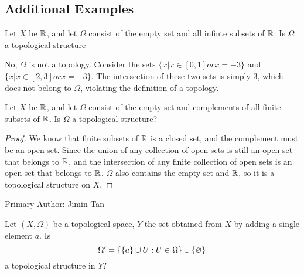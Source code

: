 \subsection{Additional Examples}

\begin{minorEx} %
  Let $X$ be $\mathbb{R}$, and let $\Omega$ consist of the empty set and
  all infinte subsets of $\mathbb{R}$. Is $\Omega$ a topological structure
\end{minorEx}

No, $\Omega$ is not a topology. Consider the sets $\{x | x \in [0, 1] or x = -3\}$ and $\{x | x \in [2, 3] or x = -3\}$. The intersection of these two sets is simply {3}, which does not belong to $\Omega$, violating the definition of a topology.


\begin{minorEx} %
  Let $X$ be $\mathbb{R}$, and let $\Omega$ consist of the empty set and
  complements of all finite subsets of $\mathbb{R}$. Is $\Omega$ a topological structure?
\end{minorEx}

\begin{proof}
We know that finite subsets of $\mathbb{R}$ is a closed set, and the complement must be an open set. Since the union of any collection of open sets is still an open set that belongs to $\mathbb{R}$, and the intersection of any finite collection of open sets is an open set that belongs to $\mathbb{R}$. $\Omega$ also contains the empty set and $\mathbb{R}$, so it is a topological structure on $X$.
\end{proof}

Primary Author: Jimin Tan

\begin{minorEx} %
    Let $(X, \Omega)$ be a topological space, $Y$ the set obtained from $X$ by
    adding a single element $a$. Is
    \[
        \Omega' = \{\{a\} \cup U : U \in \Omega\} \cup \{\varnothing\}
    \]
    a topological structure in $Y$?
\end{minorEx}

